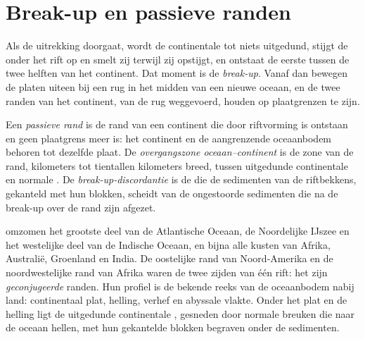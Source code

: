 \section{Break-up en passieve randen}

Als de uitrekking doorgaat, wordt de continentale  tot niets uitgedund, stijgt de  onder het rift op en smelt zij terwijl zij opstijgt, en ontstaat de eerste  tussen de twee helften van het continent. Dat moment is de \emph{break-up}. Vanaf dan bewegen de platen uiteen bij een rug in het midden van een nieuwe oceaan, en de twee randen van het continent, van de rug weggevoerd, houden op plaatgrenzen te zijn.

\begin{definition}\label{def:b1:rifts-ridges-margins:passive-margin}
Een \emph{passieve rand} is de rand van een continent die door riftvorming is ontstaan en geen plaatgrens meer is: het continent en de aangrenzende oceaanbodem behoren tot dezelfde plaat. De \emph{overgangszone oceaan--continent} is de zone van de rand, kilometers tot tientallen kilometers breed, tussen uitgedunde continentale  en normale . De \emph{break-up-discordantie} is de  die de sedimenten van de riftbekkens, gekanteld met hun blokken, scheidt van de ongestoorde sedimenten die na de break-up over de rand zijn afgezet.
\end{definition}

 omzomen het grootste deel van de Atlantische Oceaan, de Noordelijke IJszee en het westelijke deel van de Indische Oceaan, en bijna alle kusten van Afrika, Australië, Groenland en India. De oostelijke rand van Noord-Amerika en de noordwestelijke rand van Afrika waren de twee zijden van één rift: het zijn \emph{geconjugeerde} randen. Hun profiel is de bekende reeks van de oceaanbodem nabij land: continentaal plat, helling, verhef en abyssale vlakte. Onder het plat en de helling ligt de uitgedunde continentale , gesneden door normale breuken die naar de oceaan hellen, met hun gekantelde blokken begraven onder de sedimenten.

